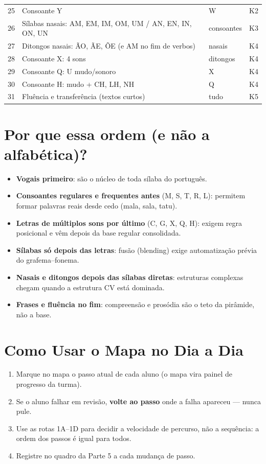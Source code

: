 \begin{center}
\begin{tabular}{|c|l|l|l|}
25 & Consoante Y & W & K2 \\
26 & Sílabas nasais: AM, EM, IM, OM, UM / AN, EN, IN, ON, UN & consoantes & K3 \\
27 & Ditongos nasais: ÃO, ÃE, ÕE (e AM no fim de verbos) & nasais & K4 \\
28 & Consoante X: 4 sons & ditongos & K4 \\
29 & Consoante Q: U mudo/sonoro & X & K4 \\
30 & Consoante H: mudo + CH, LH, NH & Q & K4 \\
31 & Fluência e transferência (textos curtos) & tudo & K5 \\
\hline
\end{tabular}
\end{center}

\section{Por que essa ordem (e não a alfabética)?}

\begin{itemize}
  \item \textbf{Vogais primeiro}: são o núcleo de toda sílaba do português.
  \item \textbf{Consoantes regulares e frequentes antes} (M, S, T, R, L):
        permitem formar palavras reais desde cedo (mala, sala, tatu).
  \item \textbf{Letras de múltiplos sons por último} (C, G, X, Q, H):
        exigem regra posicional e vêm depois da base regular consolidada.
  \item \textbf{Sílabas só depois das letras}: fusão (blending) exige
        automatização prévia do grafema--fonema.
  \item \textbf{Nasais e ditongos depois das sílabas diretas}: estruturas
        complexas chegam quando a estrutura CV está dominada.
  \item \textbf{Frases e fluência no fim}: compreensão e prosódia são o teto
        da pirâmide, não a base.
\end{itemize}

\section{Como Usar o Mapa no Dia a Dia}

\begin{enumerate}[leftmargin=2cm]
  \item Marque no mapa o passo atual de cada aluno (o mapa vira painel de
        progresso da turma).
  \item Se o aluno falhar em revisão, \textbf{volte ao passo} onde a falha
        apareceu --- nunca pule.
  \item Use as rotas 1A--1D para decidir a velocidade de percurso, não a
        sequência: a ordem dos passos é igual para todos.
  \item Registre no quadro da Parte 5 a cada mudança de passo.
\end{enumerate}

